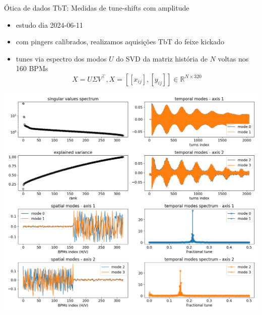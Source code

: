 \begin{frame}{Ótica de dados TbT: Medidas de tune-shifts com amplitude}
\begin{minipage}{0.38\textwidth}
    {\footnotesize
    \begin{itemize}
        \item estudo dia 2024-06-11 \href{https://ais-eng-srv-ta.cnpem.br/Olog/index.html\#22749\_1}{}
        \item com pingers calibrados, realizamos aquisições TbT do feixe kickado
        \item tunes via espectro dos modos $U$ do SVD da matriz história de $N$ voltas nos 160 BPMs $$X = U \Sigma V^\intercal,  X = [[x_{ij}], [y_{ij}]] \in \mathbb{R}^{N\times 320}$$
    \end{itemize}
}    
\end{minipage}
\hfill
\begin{minipage}{0.58\textwidth}
    \centering
    \includegraphics[width=\textwidth]{2024-06-21/figures/tbt_modal_analysis.png}
\end{minipage}
\end{frame}


